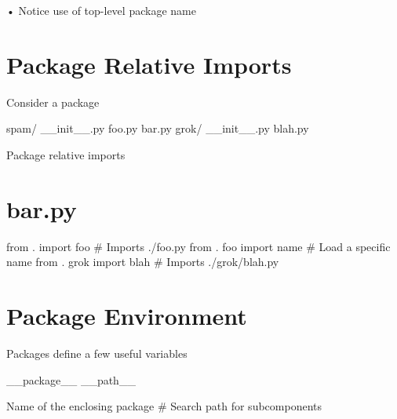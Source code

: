 \documentclass[
  letterpaper,
  DIV=11,
  numbers=noendperiod]{scrreprt}
\newenvironment{Shaded}{\begin{snugshade}}{\end{snugshade}}
\newcommand{\CommentTok}[1]{\textcolor[rgb]{0.37,0.37,0.37}{#1}}
\newcommand{\ImportTok}[1]{\textcolor[rgb]{0.00,0.46,0.62}{#1}}
\newcommand{\NormalTok}[1]{\textcolor[rgb]{0.00,0.23,0.31}{#1}}
\begin{document}
• Notice use of top-level package name


\chapter{Package Relative Imports}\label{package-relative-imports}

Consider a package

\begin{Shaded}
\begin{Highlighting}[]
\NormalTok{spam/ \_\_init\_\_.py foo.py bar.py grok/ \_\_init\_\_.py blah.py }
\end{Highlighting}
\end{Shaded}

Package relative imports


\chapter{bar.py}\label{bar.py-1}

\begin{Shaded}
\begin{Highlighting}[]
\ImportTok{from}\NormalTok{ . }\ImportTok{import}\NormalTok{ foo }\CommentTok{\# Imports ./foo.py  }
\ImportTok{from}\NormalTok{ . foo }\ImportTok{import}\NormalTok{ name }\CommentTok{\# Load a specific name  }
\ImportTok{from}\NormalTok{ . grok }\ImportTok{import}\NormalTok{ blah }\CommentTok{\# Imports ./grok/blah.py }
\end{Highlighting}
\end{Shaded}


\chapter{Package Environment}\label{package-environment}

Packages define a few useful variables

\begin{Shaded}
\begin{Highlighting}[]
\NormalTok{\_\_package\_\_ \_\_path\_\_ }
\end{Highlighting}
\end{Shaded}

\begin{Shaded}
\begin{Highlighting}[]
\NormalTok{Name of the enclosing package \# Search path for subcomponents }
\end{Highlighting}
\end{Shaded}
\end{document}
